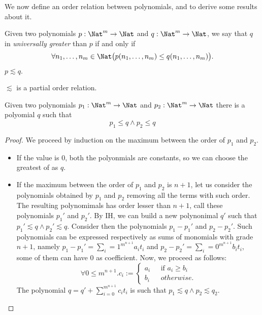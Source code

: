 We now define an order relation
between polynomials, and to derive some
results about it.

\begin{defn}
Given two polynomials $p:\Nat^m\rightarrow \Nat$
and $q:\Nat^m\rightarrow \Nat$,
we say that $q$ in \emph{universally greater}
than $p$ if and only if
$$
\forall n_1,\dots, n_m\in \Nat\big(p(n_1,\dots, n_m)\leq
q(n_1,\dots, n_m)\big).
$$
$p\lesssim q$.
\end{defn}


\begin{remark}
$\lesssim$ is a partial order relation.
\end{remark}



\begin{lemma}\label{lemma:construction}
Given two polynomials $p_1:\Nat^m\rightarrow \Nat$
and $p_2:\Nat^m\rightarrow \Nat$
there is a polyomial $q$ such that
$$
p_1\leq q \wedge p_2 \leq q
$$
\end{lemma}

\begin{proof}
We proceed by induction on the maximum
between the order of $p_1$ and $p_2$.
\begin{itemize}
\item If the value is {0},
both the polyonmials are constants,
so we can choose the greatest of
as $q$.
%
\item {If the maximum between the order
of $p_1$ and $p_2$ is $n+1$, let us consider
the polynomials obtained by
$p_1$ and $p_2$ removing all the terms
with such order.}
The resulting {polynomimals}
has order {lesser} than $n+1$,
call these polynomials $p_1'$ and $p_2'$.
By IH, we can build a new polynonimal
$q'$ such that $p_1'\lesssim q \wedge
p_2'\lesssim q$.
Consider then the polynomials $p_1-p_1'$
and {$p_2-p_2'$}.
Such polynomials can be expressed
respectively as sums of
monomials with grade $n+1$,
namely $p_1-p_1'=\sum_i=1^{m^{n+1}}a_it_i$
and $p_2-p_2'=\sum_i=0^{m^{n+1}}b_it_i$,
some of them can have {0}
as coefficient.
Now, we proceed as follows:
$$
\forall 0\leq m^{n+1}.c_i := \begin{cases}
a_i \ \ \ &\text{if } a_i\ge b_i \\
b_i \ \ \ &{otherwise.}
\end{cases}
$$
The polynomial $q=q'+\sum^{m^{n+1}}_{i=0}c_it_i$
is such that $p_1\lesssim q \wedge p_2
\lesssim q_2$.
\end{itemize}
\end{proof}




